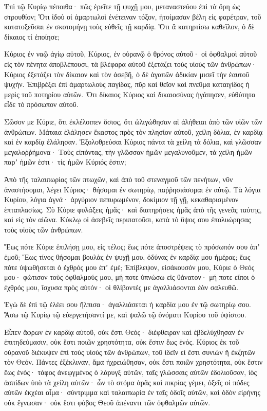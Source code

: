 \begin{spacing}{1.1}
\begin{multicols}{2}
Ἐπὶ τῷ Κυρίῳ πέποιθα· πῶς ἐρεῖτε τῇ ψυχῇ μου, μεταναστεύου ἐπὶ τὰ ὄρη ὡς στρουθίον;
Ὅτι ἰδοὺ οἱ ἁμαρτωλοὶ ἐνέτειναν τόξον, ἡτοίμασαν βέλη εἰς φαρέτραν, τοῦ κατατοξεῦσαι ἐν σκοτομήνῃ τοὺς εὐθεῖς τῇ καρδίᾳ.
Ὅτι ἃ κατηρτίσω καθεῖλον, ὁ δὲ δίκαιος τί ἐποίησε;

Κύριος ἐν ναῷ ἁγίῳ αὐτοῦ, Κύριος, ἐν οὐρανῷ ὁ θρόνος αὐτοῦ· οἱ ὀφθαλμοὶ αὐτοῦ εἰς τὸν πένητα ἀποβλέπουσι, τὰ βλέφαρα αὐτοῦ ἐξετάζει τοὺς υἱοὺς τῶν ἀνθρώπων·
Κύριος ἐξετάζει τὸν δίκαιον καὶ τὸν ἀσεβῆ, ὁ δὲ ἀγαπῶν ἀδικίαν μισεῖ τὴν ἑαυτοῦ ψυχήν.
Ἐπιβρέξει ἐπὶ ἁμαρτωλοὺς παγίδας, πῦρ καὶ θεῖον καὶ πνεῦμα καταιγίδος ἡ μερὶς τοῦ ποτηρίου αὐτῶν.
Ὅτι δίκαιος Κύριος καὶ δικαιοσύνας ἠγάπησεν, εὐθύτητα εἶδε τὸ πρόσωπον αὐτοῦ.

Σῶσον με Κύριε, ὅτι ἐκλέλοιπεν ὅσιος, ὅτι ὠλιγώθησαν αἱ ἀλήθειαι ἀπὸ τῶν υἱῶν τῶν ἀνθρώπων.
Μάταια ἐλάλησεν ἕκαστος πρὸς τὸν πλησίον αὐτοῦ, χείλη δόλια, ἐν καρδίᾳ καὶ ἐν καρδίᾳ ἐλάλησαν.
Ἐξολοθρεύσαι Κύριος πάντα τὰ χείλη τὰ δόλια, καὶ γλῶσσαν μεγαλοῤῥήμονα·
Τοὺς εἰπόντας, τὴν γλῶσσαν ἡμῶν μεγαλυνοῦμεν, τὰ χείλη ἡμῶν παρʼ ἡμῶν ἐστι· τίς ἡμῶν Κύριός ἐστιν;

Ἀπὸ τῆς ταλαιπωρίας τῶν πτωχῶν, καὶ ἀπὸ τοῦ στεναγμοῦ τῶν πενήτων, νῦν ἀναστήσομαι, λέγει Κύριος· θήσομαι ἐν σωτηρίῳ, παῤῥησιάσομαι ἐν αὐτῷ.
Τὰ λόγια Κυρίου, λόγια ἁγνά· ἀργύριον πεπυρωμένον, δοκίμιον τῇ γῇ, κεκαθαρισμένον ἑπταπλασίως.
Σὺ Κύριε φυλάξεις ἡμᾶς· καὶ διατηρήσεις ἡμᾶς ἀπὸ τῆς γενεᾶς ταύτης, καὶ εἰς τὸν αἰῶνα.
Κύκλῳ οἱ ἀσεβεῖς περιπατοῦσι, κατὰ τὸ ὕψος σου ἐπολυώρησας τοὺς υἱοὺς τῶν ἀνθρώπων.

Ἕως πότε Κύριε ἐπιλήσῃ μου, εἰς τέλος; ἕως πότε ἀποστρέψεις τὸ πρόσωπόν σου ἀπʼ ἐμοῦ;
Ἕως τίνος θήσομαι βουλὰς ἐν ψυχῇ μου, ὀδύνας ἐν καρδίᾳ μου ἡμέρας; ἕως πότε ὑψωθήσεται ὁ ἐχθρός μου ἐπʼ ἐμέ;
Ἐπίβλεψον, εἰσάκουσόν μου, Κύριε ὁ Θεός μου· φώτισον τοὺς ὀφθαλμούς μου, μή ποτε ὑπνώσω εἰς θάνατον·
μή ποτε εἴποι ὁ ἐχθρός μου, ἴσχυσα πρὸς αὐτόν· οἱ θλίβοντές με ἀγαλλιάσονται ἐὰν σαλευθῶ.

Ἐγὼ δὲ ἐπὶ τῷ ἐλέει σου ἤλπισα· ἀγαλλιάσεται ἡ καρδία μου ἐν τῷ σωτηρίῳ σου.
Ἄσω τῷ Κυρίῳ τῷ εὐεργετήσαντί με, καὶ ψαλῶ τῷ ὀνόματι Κυρίου τοῦ ὑψίστου.

Εἶπεν ἄφρων ἐν καρδίᾳ αὐτοῦ, οὐκ ἔστι Θεός· διέφθειραν καὶ ἐβδελύχθησαν ἐν ἐπιτηδεύμασιν, οὐκ ἔστι ποιῶν χρηστότητα, οὐκ ἔστιν ἕως ἑνός.
Κύριος ἐκ τοῦ οὐρανοῦ διέκυψεν ἐπὶ τοὺς υἱοὺς τῶν ἀνθρώπων, τοῦ ἰδεῖν εἰ ἔστι συνιὼν ἢ ἐκζητῶν τὸν Θεόν.
Πάντες ἐξέκλιναν, ἅμα ἠχρειώθησαν, οὐκ ἔστι ποιῶν χρηστότητα, οὐκ ἔστιν ἕως ἑνός· τάφος ἀνεῳγμένος ὁ λάρυγξ αὐτῶν, ταῖς γλώσσαις αὐτῶν ἐδολιοῦσαν, ἰὸς ἀσπίδων ὑπὸ τὰ χείλη αὐτῶν· ὧν τὸ στόμα ἀρᾶς καὶ πικρίας γέμει, ὀξεῖς οἱ πόδες αὐτῶν ἐκχέαι αἷμα· σύντριμμα καὶ ταλαιπωρία ἐν ταῖς ὁδοῖς αὐτῶν, καὶ ὁδὸν εἰρήνης οὐκ ἔγνωσαν· οὐκ ἔστι φόβος Θεοῦ ἀπέναντι τῶν ὀφθαλμῶν αὐτῶν.


\end{multicols}
\end{spacing}
